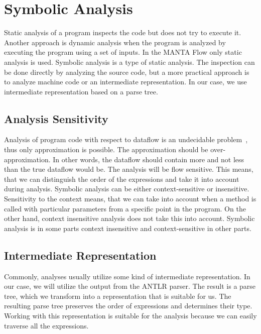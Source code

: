 \chapter{Symbolic Analysis}
Static analysis of a program inspects the code but does not try to execute it. Another approach is dynamic analysis when the program is analyzed by executing the program using a set of inputs.
In the MANTA Flow only static analysis is used. Symbolic analysis is a type of static analysis. The inspection can be done directly by analyzing the source code, but a more practical approach is to analyze machine code or an intermediate representation. In our case, we use intermediate representation based on a parse tree.

\section{Analysis Sensitivity}
Analysis of program code with respect to dataflow is an undecidable problem~\cite{turing}, thus only approximation is possible. The approximation should be over-approximation. In other words, the dataflow should contain more and not less than the true dataflow would be. The analysis will be flow sensitive. This means, that we can distinguish the order of the expressions and take it into account during analysis. Symbolic analysis can be either context-sensitive or insensitive. Sensitivity to the context means, that we can take into account when a method is called with particular parameters from a specific point in the program. On the other hand, context insensitive analysis does not take this into account. Symbolic analysis is in some parts context insensitive and context-sensitive in other parts.

\section{Intermediate Representation}
Commonly, analyses usually utilize some kind of intermediate representation. In our case, we will utilize the output from the ANTLR parser. The result is a parse tree, which we transform into a representation that is suitable for us. The resulting parse tree preserves the order of expressions and determines their type. Working with this representation is suitable for the analysis because we can easily traverse all the expressions.

